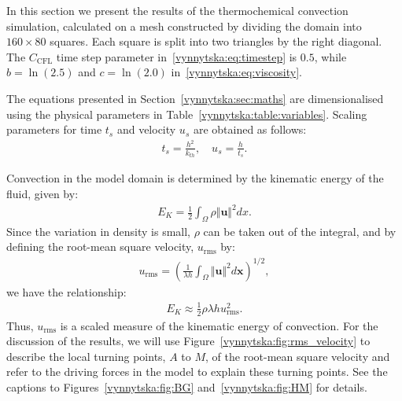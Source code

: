In this section we present the results of the thermochemical
convection simulation, calculated on a mesh constructed by dividing
the domain into $160 \times 80$ squares. Each square is split into two
triangles by the right diagonal. The $C_{\mathrm{CFL}}$ time step
parameter in~\eqref{vynnytska:eq:timestep} is $0.5$, while $b =
\ln(2.5)$ and $c = \ln(2.0)$ in~\eqref{vynnytska:eq:viscosity}.

The equations presented in Section~\ref{vynnytska:sec:maths} are
dimensionalised using the physical parameters in
Table~\ref{vynnytska:table:variables}. Scaling parameters for time
$t_s$ and velocity $u_s$ are obtained as follows:
\begin{align}
 \label{vynnytska:eq:velsc}
 t_s = \frac{h^2}{k_{th}}, \quad u_s = \frac{h}{t_s}.
\end{align}

Convection in the model domain is determined by the
kinematic energy of the fluid, given by:
\begin{align}
  \label{vynnytska:eq:KE}
  E_{K} = \frac{1}{2}\int_{\Omega}\rho \Vert \bm{u} \Vert^{2}dx.
\end{align}
Since the variation in density is small, $\rho$ can be taken out of
the integral, and by defining the root-mean square velocity, $u_{\mathrm{rms}}$
by:
\begin{align}\label{vynnytska:eq:u_rms}
u_{\mathrm{rms}}=\left( \frac{1}{\lambda h} \int_{\Omega} \Vert \bm{u} \Vert^{2} d\bm{x}  \right)^{1/2},
\end{align}
we have the relationship:
\begin{align}
  \label{vynnytska:eq:KEu_rms}
  E_{K} \approx \frac{1}{2} \rho \lambda h u_{\mathrm{rms}}^{2}.
\end{align}
Thus, $u_{\mathrm{rms}}$ is a scaled measure of the kinematic energy of
convection. For the discussion of the results, we will use
Figure~\ref{vynnytska:fig:rms_velocity} to describe the local turning
points, $A$ to $M$, of the root-mean square velocity and refer to the
driving forces in the model to explain these turning points. See the
captions to Figures~\ref{vynnytska:fig:BG} and~\ref{vynnytska:fig:HM}
for details.


